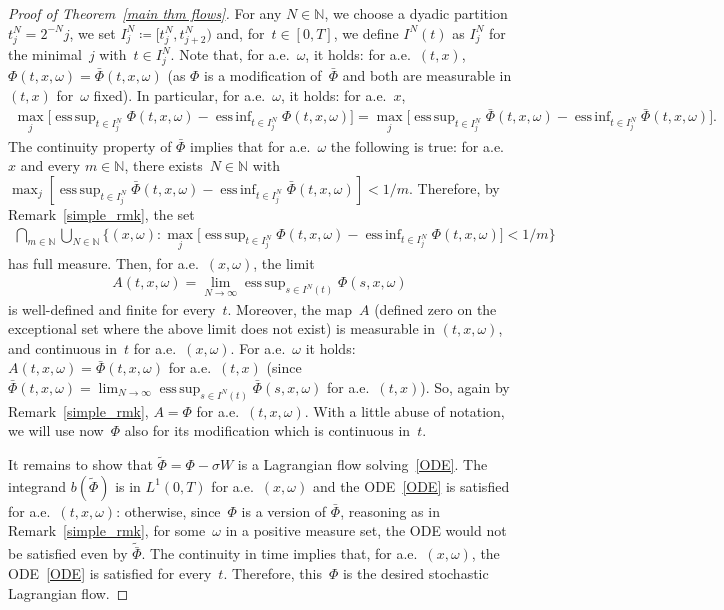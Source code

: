 \documentclass[a4paper,10pt]{article}
\newcommand\1{\mathbbm{1}}
\newcommand{\td}{\tilde}
\DeclareMathOperator*{\esssup}{ess\,sup}
\DeclareMathOperator*{\essinf}{ess\,inf}
\numberwithin{equation}{section}
\begin{document}
\begin{proof}[Proof of Theorem~\ref{main thm flows}]
For any $N \in \mathbb{N}$, we choose a dyadic partition $t^N_j=2^{-N}j$, we set $I^N_j \coloneqq [t^N_j,t^N_{j+2})$ and, for~$t \in [0,T]$, we define $I^N(t)$ as $I^N_j$ for the minimal~$j$ with~$t \in I^N_j$. Note that, for a.e.~$\omega$, it holds: for a.e.~$(t,x)$, $\Phi(t,x,\omega)=\bar{\Phi}(t,x,\omega)$ (as $\Phi$ is a modification of~$\bar{\Phi}$ and both are measurable in $(t,x)$ for~$\omega$ fixed). In particular, for a.e.~$\omega$, it holds: for a.e.~$x$,
\begin{align*}
\max_j \big[\esssup_{t\in I^N_j}\Phi(t,x,\omega) - \essinf_{t\in I^N_j}\Phi(t,x,\omega)\big] = \max_j\big[\esssup_{t\in I^N_j}\bar{\Phi}(t,x,\omega) - \essinf_{t\in I^N_j}\bar{\Phi}(t,x,\omega)\big].
\end{align*}
The continuity property of $\bar{\Phi}$ implies that for a.e.~$\omega$ the following is true: for a.e.~$x$ and every $m \in \mathbb{N}$, there exists~$N\in \mathbb{N}$ with $\max_j[\esssup_{t\in I^N_j}\bar{\Phi}(t,x,\omega) - \essinf_{t\in I^N_j}\bar{\Phi}(t,x,\omega)]<1/m$. Therefore, by Remark~\ref{simple_rmk}, the set
\begin{align*}
\bigcap_{m \in \mathbb{N}} \bigcup_{N \in \mathbb{N}} \big\{(x,\omega) \colon \max_j \big[\esssup_{t\in I^N_j}\Phi(t,x,\omega) - \essinf_{t\in I^N_j}\Phi(t,x,\omega)\big] < 1/m \big\}
\end{align*}
has full measure. Then, for a.e.~$(x,\omega)$, the limit
\begin{align*}
A(t,x,\omega)=\lim_{N \to \infty} \esssup_{s\in I^N(t)}\Phi(s,x,\omega)\end{align*}
is well-defined and finite for every~$t$. Moreover, the map~$A$ (defined zero on the exceptional set where the above limit does not exist) is measurable in $(t,x,\omega)$, and continuous in~$t$ for a.e.~$(x,\omega)$. For a.e.~$\omega$ it holds: $A(t,x,\omega)=\bar{\Phi}(t,x,\omega)$ for a.e.~$(t,x)$ (since $\bar{\Phi}(t,x,\omega)=\lim_{N \to \infty} \esssup_{s\in I^N(t)}\bar{\Phi}(s,x,\omega)$ for a.e.~$(t,x)$). So, again by Remark~\ref{simple_rmk}, $A=\Phi$ for a.e.~$(t,x,\omega)$. With a little abuse of notation, we will use now~$\Phi$ also for its modification which is continuous in~$t$.

It remains to show that $\td{\Phi} = \Phi-\sigma W$ is a Lagrangian flow solving~\eqref{ODE}. The integrand $b(\td{\Phi})$ is in $L^1(0,T)$ for a.e.~$(x,\omega)$ and the ODE~\eqref{ODE} is satisfied for a.e.~$(t,x,\omega)$: otherwise, since~$\Phi$ is a version of $\bar{\Phi}$, reasoning as in Remark~\ref{simple_rmk}, for some~$\omega$ in a positive measure set, the ODE would not be satisfied even by $\td{\bar{\Phi}}$. The continuity in time implies that, for a.e.~$(x,\omega)$, the ODE~\eqref{ODE} is satisfied for every~$t$. Therefore, this~$\Phi$ is the desired stochastic Lagrangian flow. 


\end{proof}
\end{document}
